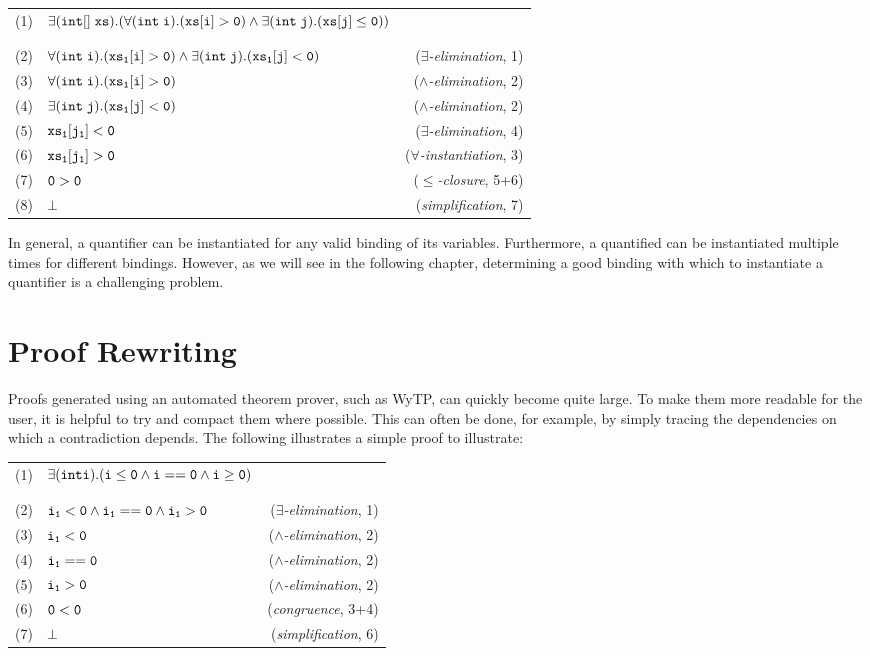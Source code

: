 \begin{tcolorbox}
\begin{tabularx}{\textwidth}{l X r}
(1) & ${\tt \exists(int[]\;xs).(\forall(int\;i).(xs[i] >
  0)\land\exists(int\;j).(xs[j] \le 0))}$&\\
&&\\
\hline
\hline
&&\\
(2) & ${\tt \forall(int\;i).(xs_1[i] > 0)\land\exists(int\;j).(xs_1[j] < 0)}$ & ($\exists${\em-elimination}, 1)\\
(3) & ${\tt \forall(int\;i).(xs_1[i] > 0)}$ & ($\land${\em-elimination}, 2)\\
(4) & ${\tt \exists(int\;j).(xs_1[j] < 0)}$ & ($\land${\em-elimination}, 2)\\
(5) & ${\tt xs_1[j_1] < 0}$ & ($\exists${\em-elimination}, 4)\\
(6) & ${\tt xs_1[j_1] > 0}$ & ($\forall${\em-instantiation}, 3)\\
(7) & ${\tt 0 > 0}$ & ($\le${\em-closure}, 5+6)\\
(8) & ${\tt\bot}$ & ({\em simplification}, 7)\\
\end{tabularx}
\end{tcolorbox}

In general, a quantifier can be instantiated for any valid binding of
its variables.  Furthermore, a quantified can be instantiated multiple
times for different bindings.  However, as we will see in the
following chapter, determining a good binding with which to
instantiate a quantifier is a challenging problem.

\section{Proof Rewriting}

Proofs generated using an automated theorem prover, such as WyTP, can
quickly become quite large.  To make them more readable for the user,
it is helpful to try and compact them where possible.  This can often
be done, for example, by simply tracing the dependencies on which a
contradiction depends.  The following illustrates a simple proof to
illustrate:

\begin{tcolorbox}
\begin{tabularx}{\textwidth}{l X r}
(1) & ${\tt \exists(int i).(i\le 0\land i==0\land i\ge 0)}$&\\
&&\\
\hline
\hline
&&\\
(2) & ${\tt i_1 < 0\land i_1==0\land i_1 > 0}$ & ($\exists${\em-elimination}, 1)\\
(3) & ${\tt i_1 < 0}$ &  ($\land${\em-elimination}, 2)\\
(4) & ${\tt i_1 == 0}$ &  ($\land${\em-elimination}, 2)\\
(5) & ${\tt i_1 > 0}$ &  ($\land${\em-elimination}, 2)\\
(6) & ${\tt 0 < 0}$ &  ({\em congruence}, 3+4)\\
(7) & ${\tt \bot}$ &  ({\em simplification}, 6)\\
\end{tabularx}
\end{tcolorbox}


